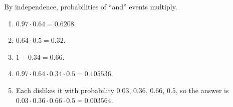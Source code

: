 By independence, probabilities of ``and'' events multiply.
\begin{enumerate}
\item[(a)] $0.97\cdot0.64=\boxed{0.6208}$.
\item[(b)] $0.64\cdot0.5=\boxed{0.32}$.
\item[(c)] $1-0.34=\boxed{0.66}$.
\item[(d)] $0.97\cdot0.64\cdot0.34\cdot0.5=\boxed{0.105536}$.
\item[(e)] Each dislikes it with probability $0.03$, $0.36$, $0.66$, $0.5$, so the answer is $0.03\cdot0.36\cdot0.66\cdot0.5=\boxed{0.003564}$.
\end{enumerate}
